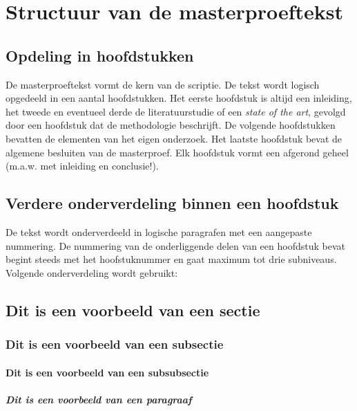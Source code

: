 
\chapter{Structuur van de masterproeftekst}

\section{Opdeling in hoofdstukken}
De masterproeftekst vormt de kern van de scriptie. De tekst wordt logisch opgedeeld in een aantal hoofdstukken. Het eerste hoofdstuk is altijd een inleiding, het tweede en eventueel derde de literatuurstudie of een \textit{state of the art}, gevolgd door een hoofdstuk dat de methodologie beschrijft. De volgende hoofdstukken bevatten de elementen van het eigen onderzoek. Het laatste hoofdstuk bevat de algemene besluiten van de masterproef. Elk hoofdstuk vormt een afgerond geheel (m.a.w. met inleiding en conclusie!).

\section{Verdere onderverdeling binnen een hoofdstuk}
De tekst wordt onderverdeeld in logische paragrafen met een aangepaste nummering. De nummering van de onderliggende delen van een hoofdstuk bevat begint steeds met het hoofstuknummer en gaat maximum tot drie subniveaus. 
Volgende onderverdeling wordt gebruikt:

\section{Dit is een voorbeeld van een sectie}
\subsection{Dit is een voorbeeld van een subsectie}
\subsubsection{Dit is een voorbeeld van een subsubsectie}
\paragraph{Dit is een voorbeeld van een paragraaf}